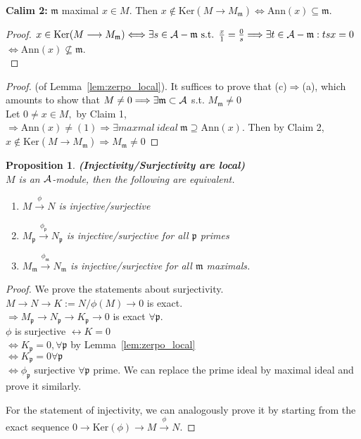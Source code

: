 \documentclass[11pt]{article}
\newtheorem{prop}[thm]{Proposition}
\newcommand{\scm}{{\mathfrak m}}
\newcommand{\scp}{{\mathfrak p}}
\newcommand{\cala}{{\cal A}}
\newcommand{\Lrta}{\Longrightarrow}
\newcommand{\lrta}{\longrightarrow}
\newcommand{\llrta}{\longleftrightarrow}
\newcommand{\Llrta}{\Longleftrightarrow}
\begin{document}
\noindent\textbf{Calim 2:}
$\scm$ maximal $x\in M$.
Then $x\not\in \text{Ker}(M\lrta M_\scm)\Llrta \text{Ann}(x)\subseteq \scm$. 
\begin{proof}
$x\in \text{Ker}(M\lrta M_\scm)\Llrta \exists s\in \cala-\scm\text{ s.t. } \frac{x}{1}=\frac{0}{s}\Lrta\exists t\in \cala-\scm: tsx=0$ $\Llrta \text{Ann}(x)\not \subseteq \scm$.\\
\end{proof}
\begin{proof}
(of Lemma~\ref{lem:zerpo_local}).
It suffices to prove that (c)$\Lrta$(a), which amounts to show that $M\neq 0\Lrta \exists \scm\subset \cala $ s.t. $M_\scm\neq 0$\\
Let $0\neq x\in M,$ by Claim 1,\\
 $\Lrta \text{Ann}(x)\neq (1)\Lrta \exists maxmal\ ideal\ \scm\supseteq \text{Ann}(x)$. Then by Claim 2,\\
$x\notin \text{Ker}(M\lrta M_\scm)\Lrta M_\scm\neq 0$
\end{proof}
\begin{prop}\label{prop:local_inj_surj}
\textbf{(Injectivity/Surjectivity are local)}\\
$M$ is an $\cala$-module, then the following are equivalent.
\begin{enumerate}[label=(\alph*)]
\item $M\overset{\phi}{\lrta}N$ is injective/surjective
\item $M_\scp\overset{\phi_\scp}{\lrta}N_\scp$ is injective/surjective for all $\scp$ primes
\item $M_\scm\overset{\phi_\scm}{\lrta}N_\scm$ is injective/surjective for all $\scm$ maximals.
\end{enumerate}
\end{prop}
\begin{proof}
We prove the statements about surjectivity.\\
$M\lrta N\lrta K:=N/\phi(M)\lrta 0$ is exact.\\
$\Lrta M_\scp\lrta N_\scp\lrta K_\scp\lrta 0$ is exact $\forall \scp$.\\
$\phi$ is surjective $\llrta K=0$\\
$\Llrta K_\scp=0,\forall\scp$ by Lemma~\ref{lem:zerpo_local}\\
$\Llrta K_\scp=0\forall\scp$\\
$\Llrta \phi_\scp$ surjective $\forall\scp$ prime. We can replace the prime ideal by maximal ideal and prove it similarly.

For the statement of injectivity, we can analogously prove it by starting from the exact sequence
$0\lrta \text{Ker}(\phi)\lrta M\overset{\phi}{\lrta}N$.
\end{proof}
\end{document}
